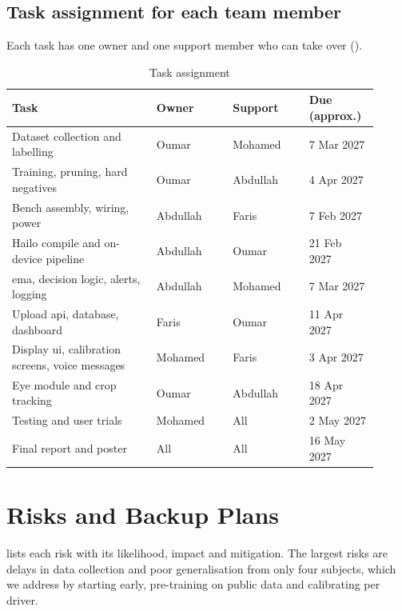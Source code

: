 \subsection{Task assignment for each team member}

Each task has one owner and one support member who can take over ().

\begin{table}[htbp]
\centering
\caption{Task assignment}
\label{tab:ch5-12}
\footnotesize
\setlength{\tabcolsep}{3pt}
\renewcommand{\arraystretch}{1.15}
\begin{tabular}{|p{0.360\linewidth}|p{0.190\linewidth}|p{0.190\linewidth}|p{0.170\linewidth}|}
\hline
\textbf{Task} & \textbf{Owner} & \textbf{Support} & \textbf{Due (approx.)} \\
\hline
Dataset collection and labelling & Oumar & Mohamed & 7 Mar 2027 \\
\hline
Training, pruning, hard negatives & Oumar & Abdullah & 4 Apr 2027 \\
\hline
Bench assembly, wiring, power & Abdullah & Faris & 7 Feb 2027 \\
\hline
Hailo compile and on-device pipeline & Abdullah & Oumar & 21 Feb 2027 \\
\hline
\gls{ema}, decision logic, alerts, logging & Abdullah & Mohamed & 7 Mar 2027 \\
\hline
Upload \gls{api}, database, dashboard & Faris & Oumar & 11 Apr 2027 \\
\hline
Display \gls{ui}, calibration screens, voice messages & Mohamed & Faris & 3 Apr 2027 \\
\hline
Eye module and crop tracking & Oumar & Abdullah & 18 Apr 2027 \\
\hline
Testing and user trials & Mohamed & All & 2 May 2027 \\
\hline
Final report and poster & All & All & 16 May 2027 \\
\hline
\end{tabular}
\end{table}

\section{Risks and Backup Plans}

 lists each risk with its likelihood, impact and mitigation. The largest risks are delays in data collection and poor generalisation from only four subjects, which we address by starting early, pre-training on public data and calibrating per driver.

